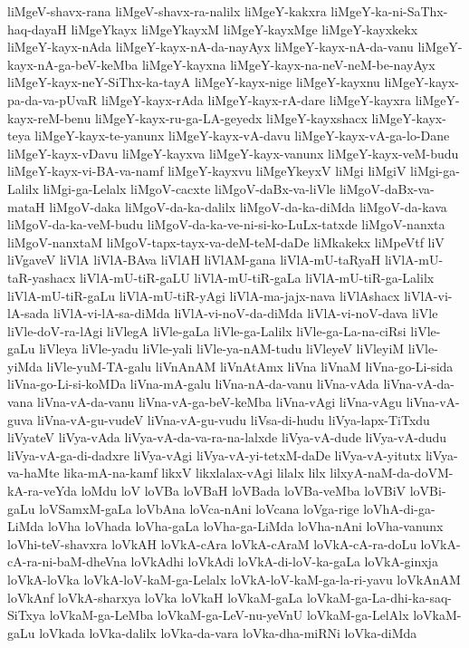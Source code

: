 {liMgeV-shavx-rana
liMgeV-shavx-ra-nalilx
liMgeY-kakxra
liMgeY-ka-ni-SaThx-haq-dayaH
liMgeYkayx
liMgeYkayxM
liMgeY-kayxMge
liMgeY-kayxkekx
liMgeY-kayx-nAda
liMgeY-kayx-nA-da-nayAyx
liMgeY-kayx-nA-da-vanu
liMgeY-kayx-nA-ga-beV-keMba
liMgeY-kayxna
liMgeY-kayx-na-neV-neM-be-nayAyx
liMgeY-kayx-neY-SiThx-ka-tayA
liMgeY-kayx-nige
liMgeY-kayxnu
liMgeY-kayx-pa-da-va-pUvaR
liMgeY-kayx-rAda
liMgeY-kayx-rA-dare
liMgeY-kayxra
liMgeY-kayx-reM-benu
liMgeY-kayx-ru-ga-LA-geyedx
liMgeY-kayxshacx
liMgeY-kayx-teya
liMgeY-kayx-te-yanunx
liMgeY-kayx-vA-davu
liMgeY-kayx-vA-ga-lo-Dane
liMgeY-kayx-vDavu
liMgeY-kayxva
liMgeY-kayx-vanunx
liMgeY-kayx-veM-budu
liMgeY-kayx-vi-BA-va-namf
liMgeY-kayxvu
liMgeYkeyxV
liMgi
liMgiV
liMgi-ga-Lalilx
liMgi-ga-Lelalx
liMgoV-cacxte
liMgoV-daBx-va-liVle
liMgoV-daBx-va-mataH
liMgoV-daka
liMgoV-da-ka-dalilx
liMgoV-da-ka-diMda
liMgoV-da-kava
liMgoV-da-ka-veM-budu
liMgoV-da-ka-ve-ni-si-ko-LuLx-tatxde
liMgoV-nanxta
liMgoV-nanxtaM
liMgoV-tapx-tayx-va-deM-teM-daDe
liMkakekx
liMpeVtf
liV
liVgaveV
liVlA
liVlA-BAva
liVlAH
liVlAM-gana
liVlA-mU-taRyaH
liVlA-mU-taR-yashacx
liVlA-mU-tiR-gaLU
liVlA-mU-tiR-gaLa
liVlA-mU-tiR-ga-Lalilx
liVlA-mU-tiR-gaLu
liVlA-mU-tiR-yAgi
liVlA-ma-jajx-nava
liVlAshacx
liVlA-vi-lA-sada
liVlA-vi-lA-sa-diMda
liVlA-vi-noV-da-diMda
liVlA-vi-noV-dava
liVle
liVle-doV-ra-lAgi
liVlegA
liVle-gaLa
liVle-ga-Lalilx
liVle-ga-La-na-ciRsi
liVle-gaLu
liVleya
liVle-yadu
liVle-yali
liVle-ya-nAM-tudu
liVleyeV
liVleyiM
liVle-yiMda
liVle-yuM-TA-galu
liVnAnAM
liVnAtAmx
liVna
liVnaM
liVna-go-Li-sida
liVna-go-Li-si-koMDa
liVna-mA-galu
liVna-nA-da-vanu
liVna-vAda
liVna-vA-da-vana
liVna-vA-da-vanu
liVna-vA-ga-beV-keMba
liVna-vAgi
liVna-vAgu
liVna-vA-guva
liVna-vA-gu-vudeV
liVna-vA-gu-vudu
liVsa-di-hudu
liVya-lapx-TiTxdu
liVyateV
liVya-vAda
liVya-vA-da-va-ra-na-lalxde
liVya-vA-dude
liVya-vA-dudu
liVya-vA-ga-di-dadxre
liVya-vAgi
liVya-vA-yi-tetxM-daDe
liVya-vA-yitutx
liVya-va-haMte
lika-mA-na-kamf
likxV
likxlalax-vAgi
lilalx
lilx
lilxyA-naM-da-doVM-kA-ra-veYda
loMdu
loV
loVBa
loVBaH
loVBada
loVBa-veMba
loVBiV
loVBi-gaLu
loVSamxM-gaLa
loVbAna
loVca-nAni
loVcana
loVga-rige
loVhA-di-ga-LiMda
loVha
loVhada
loVha-gaLa
loVha-ga-LiMda
loVha-nAni
loVha-vanunx
loVhi-teV-shavxra
loVkAH
loVkA-cAra
loVkA-cAraM
loVkA-cA-ra-doLu
loVkA-cA-ra-ni-baM-dheVna
loVkAdhi
loVkAdi
loVkA-di-loV-ka-gaLa
loVkA-ginxja
loVkA-loVka
loVkA-loV-kaM-ga-Lelalx
loVkA-loV-kaM-ga-la-ri-yavu
loVkAnAM
loVkAnf
loVkA-sharxya
loVka
loVkaH
loVkaM-gaLa
loVkaM-ga-La-dhi-ka-saq-SiTxya
loVkaM-ga-LeMba
loVkaM-ga-LeV-nu-yeVnU
loVkaM-ga-LelAlx
loVkaM-gaLu
loVkada
loVka-dalilx
loVka-da-vara
loVka-dha-miRNi
loVka-diMda
}
